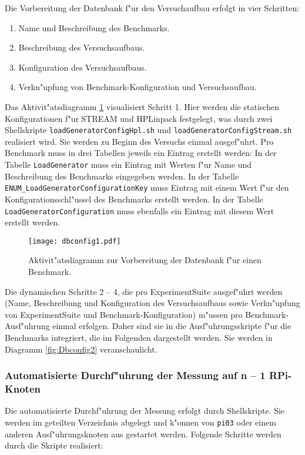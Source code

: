 Die Vorbereitung der Datenbank f"ur den Versuchaufbau erfolgt in vier Schritten:  
\begin{enumerate}\bfseries
	\item Name und Beschreibung des Benchmarks. 
	\item Beschreibung des Versuchsaufbaus. 
	\item Konfiguration des Versuchsaufbaus. 
	\item Verkn"upfung von Benchmark-Konfiguration und Versuchsaufbau.
\end{enumerate} 
Das Aktivit"atsdiagramm \ref{fig:Dbconfig1} visualisiert Schritt 1. Hier werden die statischen Konfigurationen f"ur STREAM und HPLinpack festgelegt, was durch zwei Shellskripte \texttt{loadGeneratorCon\-figHpl.sh} und \texttt{loadGenerator\-ConfigStream.sh} realisiert wird. Sie werden zu Beginn des Versuchs einmal ausgef"uhrt. Pro Benchmark muss in drei Tabellen jeweils ein Eintrag erstellt werden: In der Tabelle \texttt{LoadGenerator} muss ein Eintrag mit Werten f"ur Name und Beschreibung des Benchmarks eingegeben werden. In der Tabelle \texttt{ENUM\_LoadGeneratorConfigura\-tionKey} muss Eintrag mit einem Wert f"ur den Konfigurationsschl"ussel des Benchmarks erstellt werden. In der Tabelle \texttt{LoadGeneratorConfiguration} muss ebenfalls ein Eintrag mit diesem Wert erstellt werden.
\begin{figure}[htb]
\centering
\texttt{[image: dbconfig1.pdf]}
\caption{Aktivit"atsdiagramm zur Vorbereitung der Datenbank f"ur einen Benchmark.}
\label{fig:Dbconfig1}
\end{figure}
Die dynamischen Schritte 2 -- 4, die pro ExperimentSuite ausgef"uhrt werden (Name, Beschreibung und Konfiguration des Versuchsaufbaus sowie Verkn"upfung von ExperimentSuite und Benchmark-Konfiguration) m"ussen pro Benchmark-Ausf"uhrung einmal erfolgen. Daher sind sie in die Ausf"uhrungsskripte f"ur die Benchmarks integriert, die im Folgenden dargestellt werden. Sie werden in Diagramm \ref{fig:Dbconfig2} veranschaulicht. 

\subsubsection{Automatisierte Durchf"uhrung der Messung auf n -- 1 RPi-Knoten} 

Die automatisierte Durchf"uhrung der Messung erfolgt durch Shellskripte. Sie werden im geteilten Verzeichnis abgelegt und k"onnen von \texttt{pi03} oder einem anderen Ausf"uhrungsknoten aus gestartet werden. Folgende Schritte werden durch die Skripte realisiert: 

